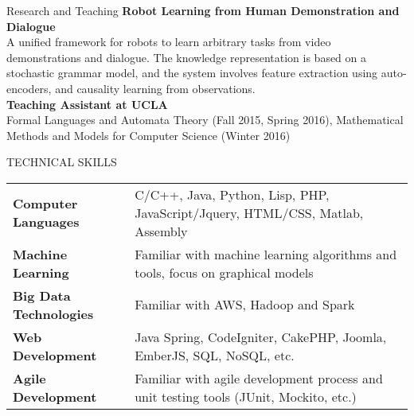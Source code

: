 \documentclass{resume} %
\begin{document}

\begin{rSection}{Research and Teaching}
\textbf{Robot Learning from Human Demonstration and Dialogue}\\
A unified framework for robots to learn arbitrary tasks from video demonstrations and dialogue. The knowledge representation is based on a stochastic grammar model, and the system involves feature extraction using auto-encoders, and causality learning from observations.\\
\textbf{Teaching Assistant at UCLA}\\  
Formal Languages and Automata Theory (Fall 2015, Spring 2016), Mathematical Methods and Models for Computer Science (Winter 2016)
\end{rSection}



\begin{rSection}{TECHNICAL SKILLS}

\begin{tabular}{ @{} >{\bfseries}l @{\hspace{6ex}} l }
Computer Languages & C/C++, Java, Python, Lisp, PHP, JavaScript/Jquery, HTML/CSS, Matlab, Assembly \\
Machine Learning & Familiar with machine learning algorithms and tools, focus on graphical models \\
Big Data Technologies & Familiar with AWS, Hadoop and Spark \\
Web Development & Java Spring, CodeIgniter, CakePHP, Joomla, EmberJS, SQL, NoSQL, etc. \\
Agile Development & Familiar with agile development process and unit testing tools (JUnit, Mockito, etc.) \\
\end{tabular}
\end {rSection}


\end{document}
